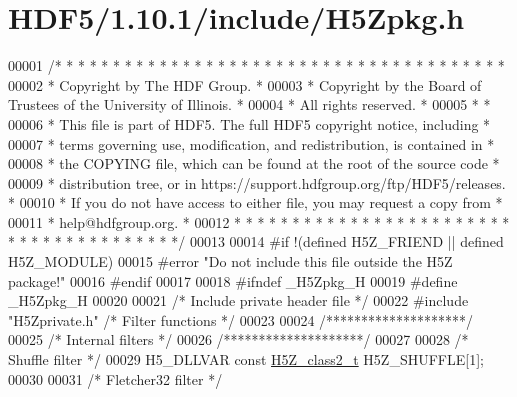 \hypertarget{_h_d_f5_21_810_81_2include_2_h5_zpkg_8h_source}{}\section{H\+D\+F5/1.10.1/include/\+H5\+Zpkg.h}
\label{_h_d_f5_21_810_81_2include_2_h5_zpkg_8h_source}

\begin{DoxyCode}
00001 \textcolor{comment}{/* * * * * * * * * * * * * * * * * * * * * * * * * * * * * * * * * * * * * * *}
00002 \textcolor{comment}{ * Copyright by The HDF Group.                                               *}
00003 \textcolor{comment}{ * Copyright by the Board of Trustees of the University of Illinois.         *}
00004 \textcolor{comment}{ * All rights reserved.                                                      *}
00005 \textcolor{comment}{ *                                                                           *}
00006 \textcolor{comment}{ * This file is part of HDF5.  The full HDF5 copyright notice, including     *}
00007 \textcolor{comment}{ * terms governing use, modification, and redistribution, is contained in    *}
00008 \textcolor{comment}{ * the COPYING file, which can be found at the root of the source code       *}
00009 \textcolor{comment}{ * distribution tree, or in https://support.hdfgroup.org/ftp/HDF5/releases.  *}
00010 \textcolor{comment}{ * If you do not have access to either file, you may request a copy from     *}
00011 \textcolor{comment}{ * help@hdfgroup.org.                                                        *}
00012 \textcolor{comment}{ * * * * * * * * * * * * * * * * * * * * * * * * * * * * * * * * * * * * * * */}
00013 
00014 \textcolor{preprocessor}{#if !(defined H5Z\_FRIEND || defined H5Z\_MODULE)}
00015 \textcolor{preprocessor}{#error "Do not include this file outside the H5Z package!"}
00016 \textcolor{preprocessor}{#endif}
00017 
00018 \textcolor{preprocessor}{#ifndef \_H5Zpkg\_H}
00019 \textcolor{preprocessor}{#define \_H5Zpkg\_H}
00020 
00021 \textcolor{comment}{/* Include private header file */}
00022 \textcolor{preprocessor}{#include "H5Zprivate.h"}          \textcolor{comment}{/* Filter functions                */}
00023 
00024 \textcolor{comment}{/********************/}
00025 \textcolor{comment}{/* Internal filters */}
00026 \textcolor{comment}{/********************/}
00027 
00028 \textcolor{comment}{/* Shuffle filter */}
00029 H5\_DLLVAR \textcolor{keyword}{const} \hyperlink{struct_h5_z__class2__t}{H5Z\_class2\_t} H5Z\_SHUFFLE[1];
00030 
00031 \textcolor{comment}{/* Fletcher32 filter */}

\end{DoxyCode}
